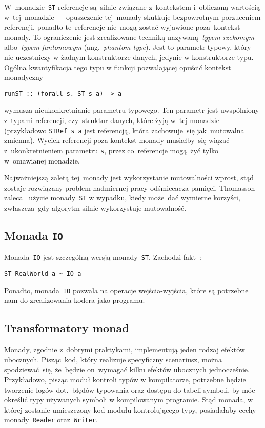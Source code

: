 \documentclass[../../praca.tex]{subfiles}
\begin{document}
W~monadzie~\texttt{ST} referencje są~silnie związane z~kontekstem i~obliczaną wartością
w~tej~monadzie --- opuszczenie tej~monady skutkuje bezpowrotnym porzuceniem referencji,
ponadto te~referencje nie~mogą zostać wyjawione poza~kontekst monady. To ograniczenie
jest zrealizowane techniką nazywaną~\emph{typem rzekomym} albo~\emph{typem fantomowym}
(ang.~\emph{phantom type}). Jest to parametr typowy, który nie uczestniczy w żadnym 
konstruktorze danych, jedynie w konstruktorze typu. Ogólna kwantyfikacja tego typu
w funkcji pozwalającej opuścić kontekst monadyczny
\begin{verbatim}
runST :: (forall s. ST s a) -> a
\end{verbatim}
wymusza nieukonkretnianie parametru typowego. Ten parametr jest uwspólniony z~typami
referencji, czy~struktur danych, które żyją w~tej monadzie (przykładowo \texttt{STRef s a}
jest referencją, która zachowuje~się jak~mutowalna zmienna).
Wyciek referencji poza kontekst monady musiałby~się wiązać z~ukonkretnieniem parametru
\texttt{s}, przez co~referencje mogą~żyć tylko w~omawianej monadzie.

Najważniejszą zaletą tej~monady jest wykorzystanie mutowalności wprost, stąd zostaje rozwiązany
problem nadmiernej pracy odśmiecacza pamięci.
Thomasson zaleca~\cite{Thomasson:HHPP} użycie monady~\texttt{ST} w wypadku, kiedy
może~dać wymierne korzyści, zwłaszcza~gdy algorytm silnie wykorzystuje mutowalność.

\subsection{Monada \texttt{IO}}

Monada~\texttt{IO} jest szczególną wersją monady~\texttt{ST}. Zachodzi fakt~\cite{Snoyman:PH}:
\begin{verbatim}
ST RealWorld a ~ IO a
\end{verbatim}

Ponadto, monada~\texttt{IO} pozwala na operacje wejścia-wyjścia, które są potrzebne nam
do zrealizowania kodera jako programu. 

\subsection{Transformatory monad}

Monady, zgodnie z~dobrymi praktykami, implementują jeden rodzaj efektów ubocznych.
Pisząc~kod, który realizuje specyficzny scenariusz, można spodziewać~się, że~będzie
on~wymagać kilku efektów ubocznych jednocześnie. Przykładowo, pisząc moduł kontroli typów
w kompilatorze, potrzebne będzie tworzenie logów 
dot.~błędów typowania oraz dostępu do tabeli symboli, by móc określić typy
używanych symboli w kompilowanym programie.
Stąd monada, w której zostanie umieszczony kod modułu kontrolującego typy, 
posiadałaby cechy monady~\texttt{Reader} oraz~\texttt{Writer}.
\end{document}
